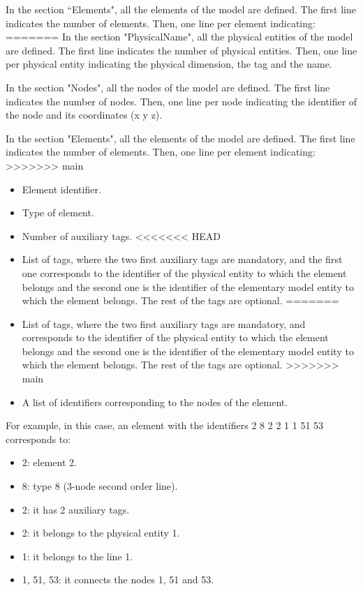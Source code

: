 \documentclass[a4]{article}
\begin{document}
In the section ``Elements", all the elements of the model are defined. The first line indicates the number of elements. Then, one line per element indicating:
=======
In the section "PhysicalName", all the physical entities of the model are defined. The first line indicates the number of physical entities. Then, one line per physical entity indicating the physical dimension, the tag and the name.  

In the section "Nodes", all the nodes of the model are defined. The first line indicates the number of nodes. Then, one line per node indicating the identifier of the node and its coordinates (x y z).

In the section "Elements", all the elements of the model are defined. The first line indicates the number of elements. Then, one line per element indicating:
>>>>>>> main

\begin{itemize}
	\item Element identifier.
	\item Type of element.
	\item Number of auxiliary tags.
<<<<<<< HEAD
	\item List of tags, where the two first auxiliary tags are mandatory, and the first one corresponds to the identifier of the physical entity to which the element belongs and the second one is the identifier of the elementary model entity to which the element belongs. The rest of the tags are optional.
=======
	\item List of tags, where the two first auxiliary tags are mandatory, and corresponds to the identifier of the physical entity to which the element belongs and the second one is the identifier of the elementary model entity to which the element belongs. The rest of the tags are optional.
>>>>>>> main
	\item A list of identifiers corresponding to the nodes of the element.
\end{itemize}

For example, in this case, an element with the identifiers 2 8 2 2 1 1 51 53 corresponds to:

\begin{itemize}
	\item 2: element 2.
	\item 8: type 8 (3-node second order line).
	\item 2: it has 2 auxiliary tags.
	\item 2: it belongs to the physical entity 1.
	\item 1: it belongs to the line 1.
	\item 1, 51, 53: it connects the nodes 1, 51 and 53.
\end{itemize} 
\end{document}
